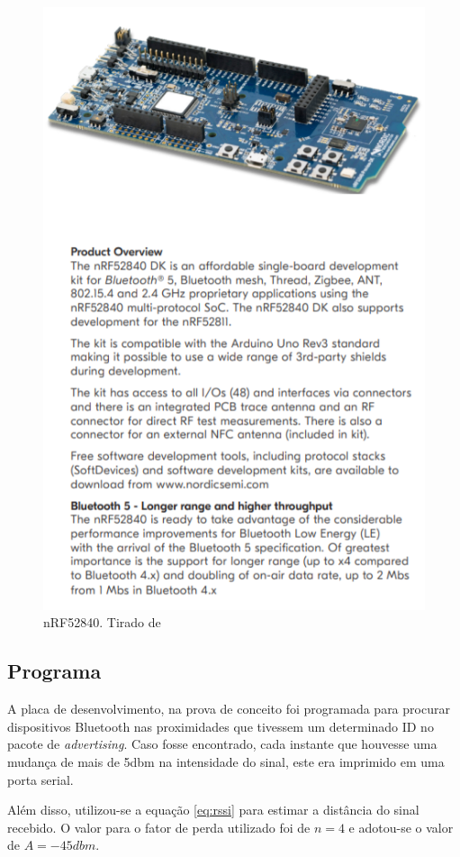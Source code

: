 \begin{figure}[H]
	\centering 
	\includegraphics[scale = 1]{images/nRF52840_dk.png}
	\caption{nRF52840. Tirado de \cite{nRF52840_site}}
	\label{fig:nRF52840_dk}
\end{figure}


\subsection{Programa}
A placa de desenvolvimento, na prova de conceito foi programada para procurar dispositivos Bluetooth nas proximidades que tivessem um determinado ID no pacote de \textit{advertising}. Caso fosse encontrado, cada instante que houvesse uma mudança de mais de 5dbm na intensidade do sinal, este era imprimido em uma porta serial.

Além disso, utilizou-se a equação \ref{eq:rssi} para estimar a distância do sinal recebido. O valor para o fator de perda utilizado foi de \(n = 4\) e adotou-se o valor de \(A = -45dbm\).

